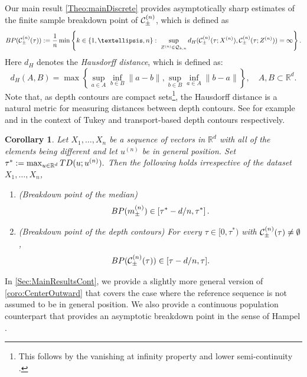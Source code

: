 \documentclass[11pt]{article}
\newcommand{\R}{\mathbb{R}}
\theoremstyle{plain}
\newtheorem{corollary}[sectioncount]{Corollary}
\theoremstyle{definition}
\begin{document}
Our main result  \autoref{Theo:mainDiscrete} provides asymptotically sharp  estimates of the 
finite sample breakdown point of $ {\cal  C}_\pm^{(n)}$, which is defined as
%
 $$
 {\rm BP}({\cal  C}_\pm^{(n)}(\tau) ):=\frac{1}{n} \min \left\{ k \in \{1, \dots, n\}: \ \sup_{Z^{(n)}\in \mathcal{Q}_{k,n}} d_H(\mathcal{C}_\pm^{(n)}(\tau; X^{(n)}), \mathcal{C}_\pm^{(n)}(\tau; Z^{(n)}))= \infty\right \}.
$$
%
Here $d_H$ denotes the 
{\it Hausdorff distance}, which   is defined as:
\[
d_H(A, B) = \max\left\{ \sup_{a \in A} \inf_{b \in B} \|a - b\|, \sup_{b \in B} \inf_{a \in A} \|b - a\| \right\}, \quad A, B \subset \mathbb{R}^d.
\]
Note that, as depth contours are compact sets\footnote{This follows by the vanishing at infinity property and lower semi-continuity \cite[ {Theorem~2.1}]{zuo:serfling2000}.}, the Hausdorff distance is a natural metric for measuring distances between depth contours. See for example  \cite{donoho:gasko1992,Brunel.2018} and \cite{delBarrioGonzalezHallin.2020}  in the context of Tukey and transport-based  depth contours respectively.
\begin{corollary}\label{coro:CenterOutward}
Let $X_1, \dots, X_n$ be a sequence of vectors in $\R^d$ with all of the elements being different and let $u^{(n)}$ be in general position. Set 
$
\tau^*:=\max_{u\in \R^d} {\rm TD}( u; u^{(n)}). $
Then the following holds irrespective of the dataset $X_1, \dots, X_n$,   
 \begin{enumerate}
     \item (Breakdown point of the median)  $$ {\rm BP}(m_\pm^{(n)})\in \left[\tau^*- {d}/n,\tau^*\right].  $$ 
     \item (Breakdown point of the depth  contours) For every $\tau\in [0,\tau^*)$ with  ${\cal  C}_\pm^{(n)}(\tau)\neq \emptyset$, 
 $$ {\rm BP}({\cal  C}_\pm^{(n)}(\tau) )\in [\tau- {d}/n,\tau]. $$ 
 \end{enumerate}
 \end{corollary}

 In \autoref{Sec:MainResultsCont}, we provide a slightly more general version of \autoref{coro:CenterOutward} that covers the case where the reference sequence is not assumed to be in general position. We also provide a continuous population counterpart that provides an asymptotic breakdown point in the sense of Hampel \cite{hampel1971}.
\end{document}
